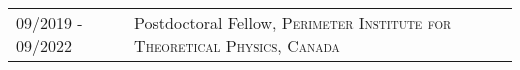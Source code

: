 \vspace*{-1.6cm}
\begin{longtable}{R{3.5cm}|p{14.8cm}}
 	09/2019 - 09/2022 & Postdoctoral Fellow, \textsc{Perimeter Institute for Theoretical Physics, Canada} \\
\end{longtable}
